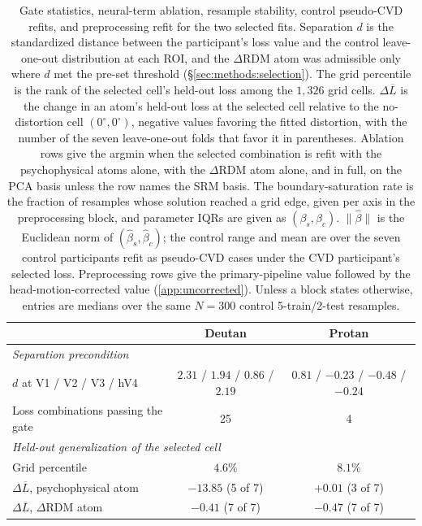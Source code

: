 \begin{table}[htbp]
  \caption{Gate statistics, neural-term ablation, resample stability, control pseudo-CVD refits, and preprocessing refit for the two selected fits. Separation $d$ is the standardized distance between the participant's loss value and the control leave-one-out distribution at each ROI, and the $\Delta$RDM atom was admissible only where $d$ met the pre-set threshold (\S\ref{sec:methods:selection}). The grid percentile is the rank of the selected cell's held-out loss among the $1{,}326$ grid cells. $\Delta\overline{L}$ is the change in an atom's held-out loss at the selected cell relative to the no-distortion cell $(0^\circ, 0^\circ)$, negative values favoring the fitted distortion, with the number of the seven leave-one-out folds that favor it in parentheses. Ablation rows give the argmin when the selected combination is refit with the psychophysical atoms alone, with the $\Delta$RDM atom alone, and in full, on the PCA basis unless the row names the SRM basis. The boundary-saturation rate is the fraction of resamples whose solution reached a grid edge, given per axis in the preprocessing block, and parameter IQRs are given as $(\beta_s, \beta_c)$. $\|\hat\beta\|$ is the Euclidean norm of $(\hat\beta_s, \hat\beta_c)$; the control range and mean are over the seven control participants refit as pseudo-CVD cases under the CVD participant's selected loss. Preprocessing rows give the primary-pipeline value followed by the head-motion-corrected value (\cref{app:uncorrected}). Unless a block states otherwise, entries are medians over the same $N = 300$ control 5-train/2-test resamples.}
  \label{tab:fit_stability}
  \centering
  \small
  \begin{tabular}{lcc}
    \toprule
    & Deutan & Protan \\ \midrule
    \multicolumn{3}{l}{\emph{Separation precondition}} \\
    \quad $d$ at V1 / V2 / V3 / hV4 & $2.31$ / $1.94$ / $0.86$ / $2.19$ & $0.81$ / $-0.23$ / $-0.48$ / $-0.24$ \\
    \quad Loss combinations passing the gate & 25 & 4 \\ \midrule
    \multicolumn{3}{l}{\emph{Held-out generalization of the selected cell}} \\
    \quad Grid percentile & $4.6\%$ & $8.1\%$ \\
    \quad $\Delta\overline{L}$, psychophysical atom & $-13.85$ (5 of 7) & $+0.01$ (3 of 7) \\
    \quad $\Delta\overline{L}$, $\Delta$RDM atom & $-0.41$ (7 of 7) & $-0.47$ (7 of 7) \\ \midrule

\end{tabular}
\end{table}
